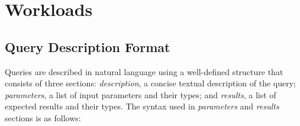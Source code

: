 \chapter{Workloads}
\label{section:workloads}


\section{Query Description Format}
\label{sub:queries_structure}
Queries are described in natural language using a well-defined structure that consists of three sections:
\textit{description}, a concise textual description of the query;
\textit{parameters}, a list of input parameters and their types;
and \textit{results}, a list of expected results and their types.
The syntax used in \textit{parameters} and \textit{results} sections is as follows:


